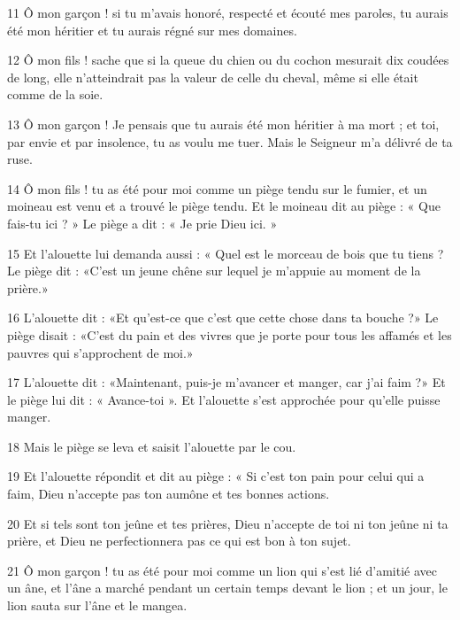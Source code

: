 \par 11 Ô mon garçon ! si tu m'avais honoré, respecté et écouté mes paroles, tu aurais été mon héritier et tu aurais régné sur mes domaines.

\par 12 Ô mon fils ! sache que si la queue du chien ou du cochon mesurait dix coudées de long, elle n'atteindrait pas la valeur de celle du cheval, même si elle était comme de la soie.

\par 13 Ô mon garçon ! Je pensais que tu aurais été mon héritier à ma mort ; et toi, par envie et par insolence, tu as voulu me tuer. Mais le Seigneur m'a délivré de ta ruse.

\par 14 Ô mon fils ! tu as été pour moi comme un piège tendu sur le fumier, et un moineau est venu et a trouvé le piège tendu. Et le moineau dit au piège : « Que fais-tu ici ? » Le piège a dit : « Je prie Dieu ici. »

\par 15 Et l'alouette lui demanda aussi : « Quel est le morceau de bois que tu tiens ? Le piège dit : «C'est un jeune chêne sur lequel je m'appuie au moment de la prière.»

\par 16 L'alouette dit : «Et qu'est-ce que c'est que cette chose dans ta bouche ?» Le piège disait : «C'est du pain et des vivres que je porte pour tous les affamés et les pauvres qui s'approchent de moi.»

\par 17 L'alouette dit : «Maintenant, puis-je m'avancer et manger, car j'ai faim ?» Et le piège lui dit : « Avance-toi ». Et l'alouette s'est approchée pour qu'elle puisse manger.

\par 18 Mais le piège se leva et saisit l'alouette par le cou.

\par 19 Et l'alouette répondit et dit au piège : « Si c'est ton pain pour celui qui a faim, Dieu n'accepte pas ton aumône et tes bonnes actions.

\par 20 Et si tels sont ton jeûne et tes prières, Dieu n'accepte de toi ni ton jeûne ni ta prière, et Dieu ne perfectionnera pas ce qui est bon à ton sujet.

\par 21 Ô mon garçon ! tu as été pour moi comme un lion qui s'est lié d'amitié avec un âne, et l'âne a marché pendant un certain temps devant le lion ; et un jour, le lion sauta sur l'âne et le mangea.


